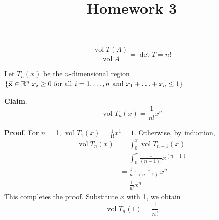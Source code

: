 \documentclass{homework}
\title{Homework 3}
\DeclareMathOperator{\vol}{vol}
\begin{document}
\maketitle

\begin{problem}{1}
$$\dfrac{\vol{T(A)}}{\vol{A}} = \det{T} = n!$$
\end{problem}

\begin{problem}{2}
Let $T_{n}(x)$ be the $n$-dimensional region
$\{\vec{\mathbf{x}} \in \mathbb{R}^n |
   x_i \geq 0\ \text{for all}\ i = 1,\hdots,n
   \ \text{and}\ x_1 + \hdots + x_n \leq 1\}$.

\textbf{Claim}.
$$\vol{T_n(x)} = \frac{1}{n!}x^n$$

\textbf{Proof}.
For $n$ = 1, $\vol{T_1(x)} = \frac{1}{1!}x^1 = 1$.
Otherwise, by induction,
\begin{align*}
\vol{T_n(x)}
&= \int_0^x \vol{T_{n-1}(x)} \\
&= \int_0^x \frac{1}{(n-1)!}x^(n-1) \\
&= \frac{1}{n} \cdot \frac{1}{(n-1)!} x^n \\
&= \frac{1}{n!} x^n
\end{align*}
This completes the proof. Substitute $x$ with 1, we obtain
$$\vol{T_n(1)} = \frac{1}{n!}$$
\end{problem}
\end{document}
